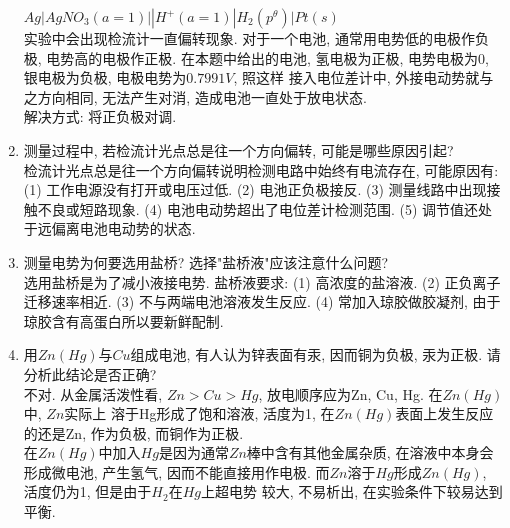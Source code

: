 \documentclass[a4paper]{article}
\begin{document}
\begin{enumerate}
	$Ag|AgNO_{3}(a = 1)||H^{+}(a=1)|H_{2}(p^{\theta})|Pt(s)$\\
	实验中会出现检流计一直偏转现象. 对于一个电池, 通常用电势低的电极作负极, 电势高的电极作正极.
	在本题中给出的电池, 氢电极为正极, 电势电极为0, 银电极为负极, 电极电势为$0.7991V$, 照这样
	接入电位差计中, 外接电动势就与之方向相同, 无法产生对消, 造成电池一直处于放电状态. \\
	解决方式: 将正负极对调.
	\item 测量过程中, 若检流计光点总是往一个方向偏转, 可能是哪些原因引起?\\
	检流计光点总是往一个方向偏转说明检测电路中始终有电流存在, 可能原因有:
	(1) 工作电源没有打开或电压过低. 
	(2) 电池正负极接反. 
	(3) 测量线路中出现接触不良或短路现象.
	(4) 电池电动势超出了电位差计检测范围.
	(5) 调节值还处于远偏离电池电动势的状态.
	\item 测量电势为何要选用盐桥? 选择"盐桥液"应该注意什么问题?\\
	选用盐桥是为了减小液接电势. 盐桥液要求: 
	(1) 高浓度的盐溶液.
	(2) 正负离子迁移速率相近.
	(3) 不与两端电池溶液发生反应.
	(4) 常加入琼胶做胶凝剂, 由于琼胶含有高蛋白所以要新鲜配制.
	\item 用$Zn(Hg)$与$Cu$组成电池, 有人认为锌表面有汞, 因而铜为负极, 汞为正极. 
	请分析此结论是否正确?\\
	不对. 从金属活泼性看, $Zn>Cu>Hg$, 放电顺序应为Zn, Cu, Hg. 在$Zn(Hg)$中, $Zn$实际上
	溶于Hg形成了饱和溶液, 活度为1, 在$Zn(Hg)$表面上发生反应的还是Zn, 作为负极, 而铜作为正极.\\
	在$Zn(Hg)$中加入$Hg$是因为通常$Zn$棒中含有其他金属杂质, 在溶液中本身会形成微电池, 产生氢气, 
	因而不能直接用作电极. 而$Zn$溶于$Hg$形成$Zn(Hg)$, 活度仍为1, 但是由于$H_{2}$在$Hg$上超电势
	较大, 不易析出, 在实验条件下较易达到平衡.
\end{enumerate}
\end{document}

